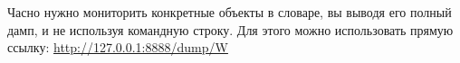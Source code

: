 
Часно нужно мониторить конкретные объекты в словаре, вы выводя его полный дамп,
и не используя командную строку. Для этого можно использовать прямую ссылку:
\url{http://127.0.0.1:8888/dump/W}

